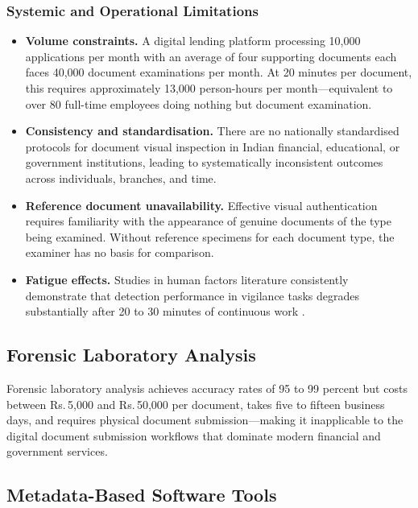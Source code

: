 \documentclass[12pt,a4paper,oneside]{report}
\newcommand{\rupee}{Rs.\,}
\begin{document}
\subsubsection*{Systemic and Operational Limitations}

\begin{itemize}

\item \textbf{Volume constraints.} A digital lending platform processing
10,000 applications per month with an average of four supporting documents each
faces 40,000 document examinations per month. At 20 minutes per document, this
requires approximately 13,000 person-hours per month---equivalent to over 80
full-time employees doing nothing but document examination.

\item \textbf{Consistency and standardisation.} There are no nationally
standardised protocols for document visual inspection in Indian financial,
educational, or government institutions, leading to systematically inconsistent
outcomes across individuals, branches, and time.

\item \textbf{Reference document unavailability.} Effective visual authentication
requires familiarity with the appearance of genuine documents of the type being
examined. Without reference specimens for each document type, the examiner has
no basis for comparison.

\item \textbf{Fatigue effects.} Studies in human factors literature
consistently demonstrate that detection performance in vigilance tasks degrades
substantially after 20 to 30 minutes of continuous work \cite{farid2009}.

\end{itemize}

\subsection{Forensic Laboratory Analysis}

Forensic laboratory analysis achieves accuracy rates of 95 to 99 percent but
costs between \rupee 5,000 and \rupee 50,000 per document, takes five to fifteen
business days, and requires physical document submission---making it inapplicable
to the digital document submission workflows that dominate modern financial and
government services.

\subsection{Metadata-Based Software Tools}
\end{document}
